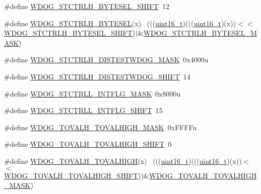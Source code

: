 \begin{DoxyCompactItemize}
\item 
\#define \hyperlink{group___w_d_o_g___register___masks_ga0f73c2f0d56eac9caafc8a0337f95cc8}{W\+D\+O\+G\+\_\+\+S\+T\+C\+T\+R\+L\+H\+\_\+\+B\+Y\+T\+E\+S\+E\+L\+\_\+\+S\+H\+I\+FT}~12
\item 
\#define \hyperlink{group___w_d_o_g___register___masks_ga55e244387ea5a80b67dceb3e86af7160}{W\+D\+O\+G\+\_\+\+S\+T\+C\+T\+R\+L\+H\+\_\+\+B\+Y\+T\+E\+S\+EL}(x)                                ~(((\hyperlink{_p_e___types_8h_a1f1825b69244eb3ad2c7165ddc99c956}{uint16\+\_\+t})(((\hyperlink{_p_e___types_8h_a1f1825b69244eb3ad2c7165ddc99c956}{uint16\+\_\+t})(x))$<$$<$\hyperlink{group___w_d_o_g___register___masks_ga0f73c2f0d56eac9caafc8a0337f95cc8}{W\+D\+O\+G\+\_\+\+S\+T\+C\+T\+R\+L\+H\+\_\+\+B\+Y\+T\+E\+S\+E\+L\+\_\+\+S\+H\+I\+FT}))\&\hyperlink{group___w_d_o_g___register___masks_ga20d3012eda5935f73ec4a9e24720fdc2}{W\+D\+O\+G\+\_\+\+S\+T\+C\+T\+R\+L\+H\+\_\+\+B\+Y\+T\+E\+S\+E\+L\+\_\+\+M\+A\+SK})
\item 
\#define \hyperlink{group___w_d_o_g___register___masks_gadc235bcbd7644d445d3ca5cb682cdc57}{W\+D\+O\+G\+\_\+\+S\+T\+C\+T\+R\+L\+H\+\_\+\+D\+I\+S\+T\+E\+S\+T\+W\+D\+O\+G\+\_\+\+M\+A\+SK}~0x4000u
\item 
\#define \hyperlink{group___w_d_o_g___register___masks_gabc176648bbc119e959823d20c38d3ece}{W\+D\+O\+G\+\_\+\+S\+T\+C\+T\+R\+L\+H\+\_\+\+D\+I\+S\+T\+E\+S\+T\+W\+D\+O\+G\+\_\+\+S\+H\+I\+FT}~14
\item 
\#define \hyperlink{group___w_d_o_g___register___masks_ga28985249246b9ad12b7f4e50d5d1ee46}{W\+D\+O\+G\+\_\+\+S\+T\+C\+T\+R\+L\+L\+\_\+\+I\+N\+T\+F\+L\+G\+\_\+\+M\+A\+SK}~0x8000u
\item 
\#define \hyperlink{group___w_d_o_g___register___masks_ga672e303cca0aaea64e48b5e632a2e666}{W\+D\+O\+G\+\_\+\+S\+T\+C\+T\+R\+L\+L\+\_\+\+I\+N\+T\+F\+L\+G\+\_\+\+S\+H\+I\+FT}~15
\item 
\#define \hyperlink{group___w_d_o_g___register___masks_ga3b934300a204f2b11fefc7961dc25f55}{W\+D\+O\+G\+\_\+\+T\+O\+V\+A\+L\+H\+\_\+\+T\+O\+V\+A\+L\+H\+I\+G\+H\+\_\+\+M\+A\+SK}~0x\+F\+F\+F\+Fu
\item 
\#define \hyperlink{group___w_d_o_g___register___masks_ga6729532c2b047c0d3327ffcf7357825c}{W\+D\+O\+G\+\_\+\+T\+O\+V\+A\+L\+H\+\_\+\+T\+O\+V\+A\+L\+H\+I\+G\+H\+\_\+\+S\+H\+I\+FT}~0
\item 
\#define \hyperlink{group___w_d_o_g___register___masks_ga186f8f5792b34501fe75c6303c530e17}{W\+D\+O\+G\+\_\+\+T\+O\+V\+A\+L\+H\+\_\+\+T\+O\+V\+A\+L\+H\+I\+GH}(x)                              ~(((\hyperlink{_p_e___types_8h_a1f1825b69244eb3ad2c7165ddc99c956}{uint16\+\_\+t})(((\hyperlink{_p_e___types_8h_a1f1825b69244eb3ad2c7165ddc99c956}{uint16\+\_\+t})(x))$<$$<$\hyperlink{group___w_d_o_g___register___masks_ga6729532c2b047c0d3327ffcf7357825c}{W\+D\+O\+G\+\_\+\+T\+O\+V\+A\+L\+H\+\_\+\+T\+O\+V\+A\+L\+H\+I\+G\+H\+\_\+\+S\+H\+I\+FT}))\&\hyperlink{group___w_d_o_g___register___masks_ga3b934300a204f2b11fefc7961dc25f55}{W\+D\+O\+G\+\_\+\+T\+O\+V\+A\+L\+H\+\_\+\+T\+O\+V\+A\+L\+H\+I\+G\+H\+\_\+\+M\+A\+SK})

\end{DoxyCompactItemize}
